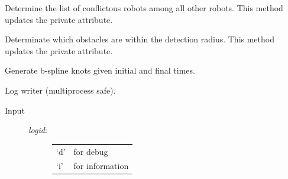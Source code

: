 \documentclass[letterpaper,10pt,english]{sphinxmanual}
\begin{document}
\begin{fulllineitems}
\begin{fulllineitems}
\end{fulllineitems}


\begin{fulllineitems}
\label{Multi-robot motion planner:planning_sim.Robot._compute_conflicts}
Determine the list of conflictous robots among all other robots.
This method updates the  private attribute.

\end{fulllineitems}


\begin{fulllineitems}
\label{Multi-robot motion planner:planning_sim.Robot._detect_obst}
Determinate which obstacles are within the detection radius.
This method updates the 
private attribute.

\end{fulllineitems}


\begin{fulllineitems}
\label{Multi-robot motion planner:planning_sim.Robot._gen_knots}
Generate b-spline knots given initial and final times.

\end{fulllineitems}


\begin{fulllineitems}
\label{Multi-robot motion planner:planning_sim.Robot._log}
Log writer (multiprocess safe).
\begin{description}
\item[{Input}] \leavevmode\begin{description}
\item[{\emph{logid}:}] \leavevmode
\begin{tabulary}{\linewidth}{|L|L|}
\hline

`d'
 & 
for debug
\\

`i'
 & 
for information
\\


\end{tabulary}
\end{description}
\end{description}
\end{fulllineitems}
\end{fulllineitems}
\end{document}
